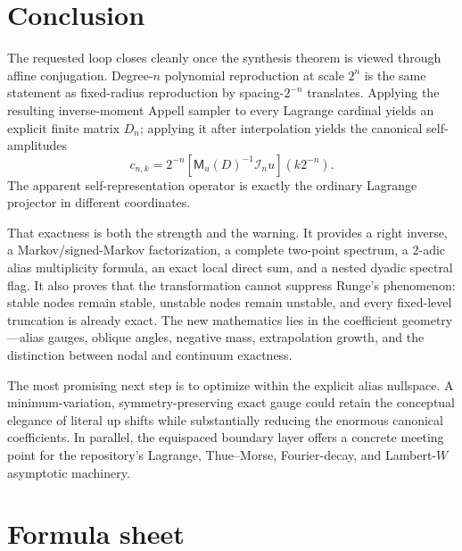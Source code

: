 \documentclass[11pt,oneside]{article}
\numberwithin{equation}{section}
\theoremstyle{definition}
\theoremstyle{remark}
\newcommand{\MGF}{\mathsf M}
\newcommand{\Lag}{\mathcal I}
\begin{document}
\section{Conclusion}
\label{sec:conclusion}

The requested loop closes cleanly once the synthesis theorem is viewed
through affine conjugation.  Degree-$n$ polynomial reproduction at scale
$2^n$ is the same statement as fixed-radius reproduction by spacing-$2^{-n}$
translates.  Applying the resulting inverse-moment Appell sampler to every
Lagrange cardinal yields an explicit finite matrix $D_n$; applying it after
interpolation yields the canonical self-amplitudes
\[
 c_{n,k}=2^{-n}[\MGF_u(D)^{-1}\Lag_nu](k2^{-n}).
\]
The apparent self-representation operator is exactly the ordinary Lagrange
projector in different coordinates.

That exactness is both the strength and the warning.  It provides a right
inverse, a Markov/signed-Markov factorization, a complete two-point spectrum,
a $2$-adic alias multiplicity formula, an exact local direct sum, and a
nested dyadic spectral flag.  It also proves that the transformation cannot
suppress Runge's phenomenon: stable nodes remain stable, unstable nodes
remain unstable, and every fixed-level truncation is already exact.  The new
mathematics lies in the coefficient geometry---alias gauges, oblique angles,
negative mass, extrapolation growth, and the distinction between nodal and
continuum exactness.

The most promising next step is to optimize within the explicit alias
nullspace.  A minimum-variation, symmetry-preserving exact gauge could retain
the conceptual elegance of literal up shifts while substantially reducing
the enormous canonical coefficients.  In parallel, the equispaced boundary
layer offers a concrete meeting point for the repository's Lagrange,
Thue--Morse, Fourier-decay, and Lambert-$W$ asymptotic machinery.

\appendix

\section{Formula sheet}
\label{app:formula-sheet}
\end{document}
